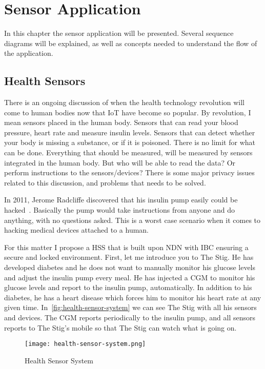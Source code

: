 \chapter{Sensor Application}\label{sensor-application}
In this chapter the sensor application will be presented. 
Several sequence diagrams will be explained, as well as concepts needed to understand the flow of the application. 

\section{Health Sensors}
There is an ongoing discussion of when the health technology revolution will come to human bodies now that \gls{IoT} have become so popular.
By revolution, I mean sensors placed in the human body. 
Sensors that can read your blood pressure, heart rate and measure insulin levels.
Sensors that can detect whether your body is missing a substance, or if it is poisoned. 
There is no limit for what can be done.
Everything that should be measured, will be measured by sensors integrated in the human body.
But who will be able to read the \gls{data}?
Or perform instructions to the sensors/devices?
There is some major privacy issues related to this discussion, and problems that needs to be solved.

In 2011, Jerome Radcliffe discovered that his insulin pump easily could be hacked~\cite{radcliffe2011hacking}.
Basically the pump would take instructions from anyone and do anything, with no questions asked. 
This is a worst case scenario when it comes to hacking medical devices attached to a human.

For this matter I propose a \gls{HSS} that is built upon \gls{NDN} with \gls{IBC} ensuring a secure and locked environment.
First, let me introduce you to The Stig. 
He has developed diabetes and he does not want to manually monitor his glucose levels and adjust the insulin pump every meal. 
He has injected a \gls{CGM} to monitor his glucose levels and report to the insulin pump, automatically.
In addition to his diabetes, he has a heart disease which forces him to monitor his heart rate at any given time. 
In~\autoref{fig:health-sensor-system} we can see The Stig with all his sensors and devices. 
The \gls{CGM} reports periodically to the insulin pump, and all sensors reports to The Stig's mobile so that The Stig can watch what is going on.

\begin{figure}[ht]
  \centering
  \texttt{[image: health-sensor-system.png]}
  \caption{Health Sensor System}
  \label{fig:health-sensor-system}
\end{figure}

